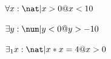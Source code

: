 \documentclass[a4paper,10pt,fleqn]{article}
\begin{document}
\noindent
$\forall x : \nat | x > 0 @ x < 10$


\noindent
$\exists y : \num | y < 0 @ y > -10$


\noindent
$\exists_1 x : \nat | x * x = 4 @ x > 0$
\end{document}
